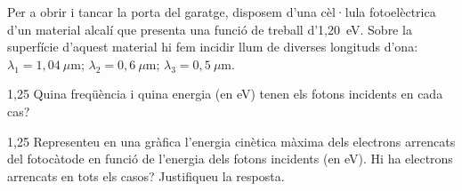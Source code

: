 Per a obrir i tancar la porta del garatge, disposem d'una cèl·lula fotoelèctrica d'un material alcalí que presenta una funció de treball d'1,20~eV. Sobre la superfície d'aquest material hi fem incidir llum de diverses longituds d'ona: $\lambda_1 = 1,04\ \mu\mathrm{m}$; $\lambda_2 = 0,6\ \mu\mathrm{m}$; $\lambda_3 = 0,5\ \mu\mathrm{m}$.

\begin{apartat}{1,25}
Quina freqüència i quina energia (en eV) tenen els fotons incidents en cada cas?
\end{apartat}

\begin{apartat}{1,25}
Representeu en una gràfica l'energia cinètica màxima dels electrons arrencats del fotocàtode en funció de l'energia dels fotons incidents (en eV). Hi ha electrons arrencats en tots els casos? Justifiqueu la resposta.
\end{apartat}

